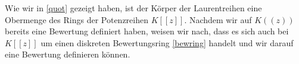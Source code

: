 %
Wie wir in \ref{quot} gezeigt haben, ist der Körper der Laurentreihen eine Obermenge des Rings der Potenzreihen $K[[z]]$. Nachdem wir auf $K((z))$ bereits eine Bewertung definiert haben, weisen wir nach, dass es sich auch bei $K[[z]]$ um einen diskreten Bewertungsring \ref{bewring} handelt und wir darauf eine Bewertung definieren können. 


